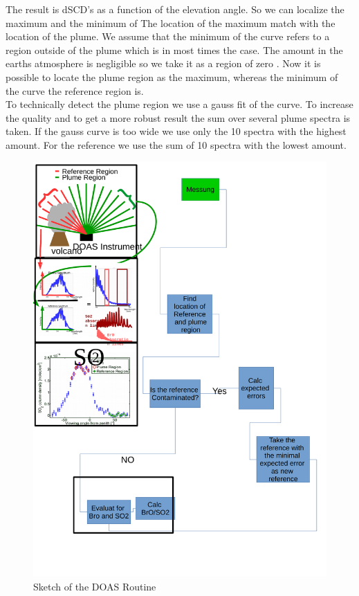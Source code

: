 \documentclass  [
  paper    = a4,
  BCOR     = 10mm,
  twoside,
  fontsize = 12pt,
  fleqn,
  toc      = bibnumbered,
  toc      = listofnumbered,
  numbers  = noendperiod,
  headings = normal,
  listof   = leveldown,
  version  = 3.03
]                                       {scrreprt}
\begin{document}
	The result is  dSCD's as a function of the elevation angle. So we can localize the maximum and the minimum of 
	The location of the  maximum match with the location of the plume. We assume that the minimum of the  curve refers to a region outside of the plume which is in most times the case. The  amount in the earths atmosphere is negligible so we take it as a region of zero . Now it is possible to locate the plume region as the  maximum, whereas the minimum of the  curve the reference region is. \\
	To technically detect the plume region we use a gauss fit of the  curve.
	To increase the quality and to get a more robust result the sum over several plume spectra is taken. If the gauss curve is too wide we use only the 10 spectra with the highest  amount. For the reference we use the sum of 10 spectra with the lowest  amount.\\
	\begin{figure}
		\centering
		\includegraphics[width=0.7\linewidth]{Bilder/DOAS_Routine}
		\caption{Sketch of the DOAS Routine }
		\label{fig:FlussDiag}
	\end{figure}
	
\end{document}
